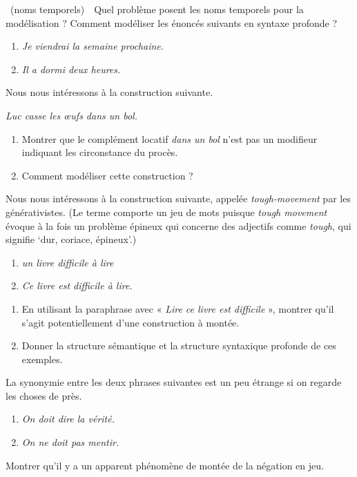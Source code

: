 {~(noms temporels)\ \ Quel problème posent les noms temporels pour la modélisation ? Comment modéliser les énoncés suivants en syntaxe profonde ?
\begin{enumerate}[label=\alph*.]
\item\textit{Je viendrai la semaine prochaine.}
\item\textit{Il a dormi deux heures.}
\end{enumerate}

 Nous nous intéressons à la construction suivante.
\begin{exe}
\exi{}\textit{Luc casse les œufs dans un bol.}
\end{exe}
\begin{enumerate}
\item Montrer que le complément locatif \textit{dans un bol} n’est pas un modifieur indiquant les circonstance du procès.
\item Comment modéliser cette construction ?
\end{enumerate}

 Nous nous intéressons à la construction suivante, appelée \textit{tough-movement} par les générativistes. (Le terme comporte un jeu de mots puisque \textit{tough movement} évoque à la fois un problème épineux qui concerne des adjectifs comme \textit{tough}, qui signifie ‘dur, coriace, épineux’.)
\begin{enumerate}[label=\alph*.]
\item \textit{un livre difficile à lire}
\item\textit{Ce livre est difficile à lire.}
\end{enumerate}
\begin{enumerate}
\item En utilisant la paraphrase avec « \textit{Lire ce livre est difficile} », montrer qu’il s’agit potentiellement d’une construction à montée.
\item Donner la structure sémantique et la structure syntaxique profonde de ces exemples.
\end{enumerate}

 La synonymie entre les deux phrases suivantes est un peu étrange si on regarde les choses de près.
\begin{enumerate}[label=\alph*.]
\item \textit{On doit dire la vérité.}
\item \textit{On ne doit pas mentir.}
\end{enumerate}
Montrer qu’il y a un apparent phénomène de montée de la négation en jeu.}


